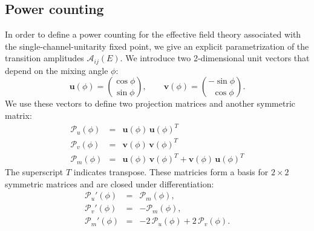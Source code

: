 \documentclass[%
 reprint,
 amsmath,amssymb,
 aps,
]{revtex4-1}
\begin{document}
\subsection{Power counting}
\label{sec:powercounting}

In order to define a power counting for the effective field theory associated with the single-channel-unitarity fixed point, we give an explicit parametrization of the transition amplitudes $\mathcal{A}_{ij}(E)$. We introduce two 2-dimensional unit vectors that depend on the mixing angle $\phi$:
\begin{equation}
\label{eq:u,v-def}
\bm{u}(\phi) = \binom{\cos\phi}{\sin\phi}, \qquad \bm{v}(\phi) = \binom{-\sin\phi}{~~\cos\phi}.
\end{equation}
We use these vectors to define two projection matrices and another symmetric matrix:
\begin{subequations}
\begin{eqnarray}
\bm{\mathcal{P}}_u(\phi) &=& \bm{u}(\phi)\, \bm{u}(\phi)^T
\label{eq:Pu}
\\ 
\bm{\mathcal{P}}_v(\phi) &=& \bm{v}(\phi)\, \bm{v}(\phi)^T
\label{eq:Pv}
\\ 
\bm{\mathcal{P}}_m(\phi) &=& \bm{u}(\phi)\, \bm{v}(\phi)^T + \bm{v}(\phi)\, \bm{u}(\phi)^T
\label{eq:Pm}
\end{eqnarray}
\label{eq:Pu,Pv,Pm}%
\end{subequations}
The superscript $T$ indicates transpose. These matricies form a basis for $2 \times 2$ symmetric matrices and are closed under differentiation:
\begin{subequations}
\begin{eqnarray}
\bm{\mathcal{P}}_u'(\phi) &=& \bm{\mathcal{P}}_m(\phi), 
\label{eq:dPu}
\\ 
\bm{\mathcal{P}}_v'(\phi) &=& -\bm{\mathcal{P}}_m(\phi), 
\label{eq:dPv}
\\ 
\bm{\mathcal{P}}_m'(\phi) &=& -2\, \bm{\mathcal{P}}_u(\phi) +2\, \bm{\mathcal{P}}_v(\phi).
\label{eq:dPm}
\end{eqnarray}
\label{eq:dPu,dPv,dPm}%
\end{subequations}
\end{document}
